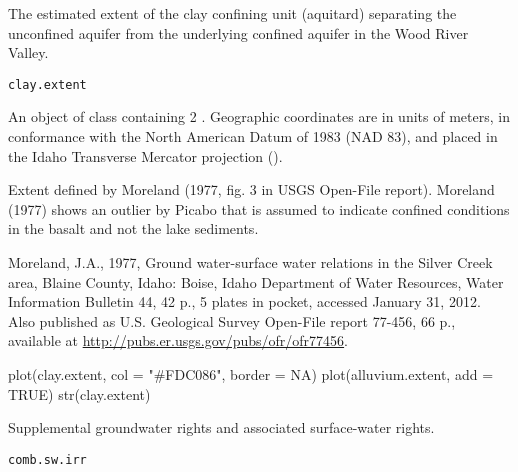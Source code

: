 \documentclass[a4paper]{book}
\begin{document}
%
\begin{Description}\relax
The estimated extent of the clay confining unit (aquitard) separating the unconfined aquifer from the underlying confined aquifer in the Wood River Valley.
\end{Description}
%
\begin{Usage}
\begin{verbatim}
clay.extent
\end{verbatim}
\end{Usage}
%
\begin{Format}
An object of  class containing 2 .
Geographic coordinates are in units of meters, in conformance with the North American Datum of 1983 (NAD 83), and placed in the
Idaho Transverse Mercator projection ().
\end{Format}
%
\begin{Source}\relax
Extent defined by Moreland (1977, fig. 3 in USGS Open-File report).
Moreland (1977) shows an outlier by Picabo that is assumed to indicate confined conditions in the basalt and not the lake sediments.
\end{Source}
%
\begin{References}\relax
Moreland, J.A., 1977, Ground water-surface water relations in the Silver Creek area, Blaine County, Idaho: Boise, Idaho Department of Water Resources, Water Information Bulletin 44, 42 p., 5 plates in pocket, accessed January 31, 2012.
Also published as U.S. Geological Survey Open-File report 77-456, 66 p., available at \url{http://pubs.er.usgs.gov/pubs/ofr/ofr77456}.
\end{References}
%
\begin{Examples}
\begin{ExampleCode}
plot(clay.extent, col = "#FDC086", border = NA)
plot(alluvium.extent, add = TRUE)
str(clay.extent)
\end{ExampleCode}
\end{Examples}
%
\begin{Description}\relax
Supplemental groundwater rights and associated surface-water rights.
\end{Description}
%
\begin{Usage}
\begin{verbatim}
comb.sw.irr
\end{verbatim}
\end{Usage}
\end{document}
